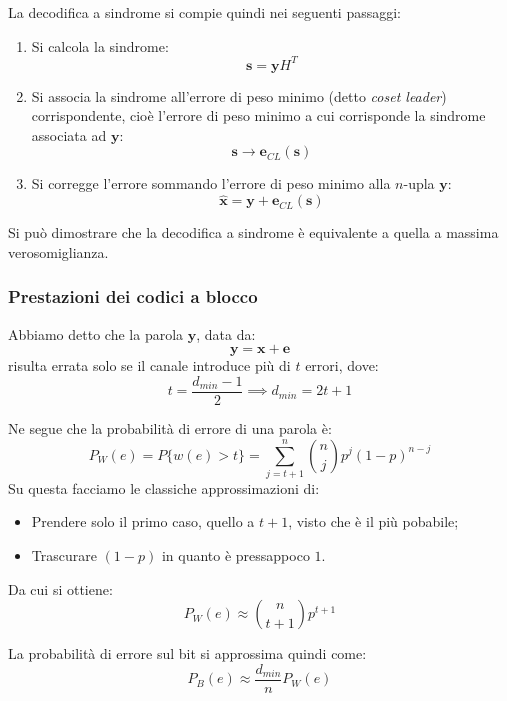 \documentclass[a4paper,11pt]{article}
\begin{document}
La decodifica a sindrome si compie quindi nei seguenti passaggi:
\begin{enumerate}
\item Si calcola la sindrome:
$$
\mathbf{s} = \mathbf{y} H^T
$$
\item Si associa la sindrome all'errore di peso minimo (detto \textit{coset leader}) corrispondente, cioè l'errore di peso minimo a cui corrisponde la sindrome associata ad $\mathbf{y}$:
$$
\mathbf{s} \rightarrow \mathbf{e}_{CL} (\mathbf{s})
$$
\item Si corregge l'errore sommando l'errore di peso minimo alla $n$-upla $\mathbf{y}$:
$$
\hat{\mathbf{x}} = \mathbf{y} + \mathbf{e}_{CL}(\mathbf{s})
$$
\end{enumerate}

Si può dimostrare che la decodifica a sindrome è equivalente a quella a massima verosomiglianza.

\subsubsection{Prestazioni dei codici a blocco}
Abbiamo detto che la parola $\mathbf{y}$, data da:
$$
\mathbf{y} = \mathbf{x} + \mathbf{e}
$$
risulta errata solo se il canale introduce più di $t$ errori, dove:
$$
t = \frac{d_{min} - 1}{2} \implies d_{min} = 2 t + 1
$$

Ne segue che la probabilità di errore di una parola è:
$$
P_W(e) = P\{ w(e) > t \} = \sum_{j = t + 1}^n \binom{n}{j} p^j (1 - p)^{n - j}
$$
Su questa facciamo le classiche approssimazioni di:
\begin{itemize}
	\item Prendere solo il primo caso, quello a $t + 1$, visto che è il più pobabile;
	\item Trascurare $(1 - p)$ in quanto è pressappoco $1$.
\end{itemize}
Da cui si ottiene:
$$
P_W(e) \approx \binom{n}{t + 1} p^{t + 1}
$$

La probabilità di errore sul bit si approssima quindi come:
$$
P_B(e) \approx \frac{d_{min}}{n} P_W(e)
$$
\end{document}
